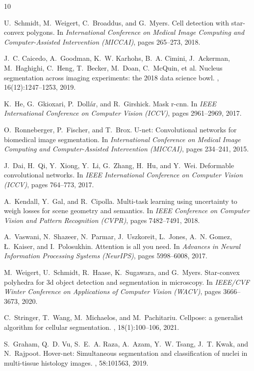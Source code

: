 \documentclass[acmlarge]{acmart}
\begin{document}

\begin{thebibliography}{10}

U.~Schmidt, M.~Weigert, C.~Broaddus, and G.~Myers.
\newblock Cell detection with star-convex polygons.
\newblock In {\em International Conference on Medical Image Computing and Computer-Assisted Intervention (MICCAI)}, pages 265--273, 2018.

J.~C. Caicedo, A.~Goodman, K.~W. Karhohs, B.~A. Cimini, J.~Ackerman, M.~Haghighi, C.~Heng, T.~Becker, M.~Doan, C.~McQuin, et al.
\newblock Nucleus segmentation across imaging experiments: the 2018 data science bowl.
, 16(12):1247--1253, 2019.

K.~He, G.~Gkioxari, P.~Doll{\'a}r, and R.~Girshick.
\newblock Mask r-cnn.
\newblock In {\em IEEE International Conference on Computer Vision (ICCV)}, pages 2961--2969, 2017.

O.~Ronneberger, P.~Fischer, and T.~Brox.
\newblock U-net: Convolutional networks for biomedical image segmentation.
\newblock In {\em International Conference on Medical Image Computing and Computer-Assisted Intervention (MICCAI)}, pages 234--241, 2015.

J.~Dai, H.~Qi, Y.~Xiong, Y.~Li, G.~Zhang, H.~Hu, and Y.~Wei.
\newblock Deformable convolutional networks.
\newblock In {\em IEEE International Conference on Computer Vision (ICCV)}, pages 764--773, 2017.

A.~Kendall, Y.~Gal, and R.~Cipolla.
\newblock Multi-task learning using uncertainty to weigh losses for scene geometry and semantics.
\newblock In {\em IEEE Conference on Computer Vision and Pattern Recognition (CVPR)}, pages 7482--7491, 2018.

A.~Vaswani, N.~Shazeer, N.~Parmar, J.~Uszkoreit, L.~Jones, A.~N. Gomez, {\L}.~Kaiser, and I.~Polosukhin.
\newblock Attention is all you need.
\newblock In {\em Advances in Neural Information Processing Systems (NeurIPS)}, pages 5998--6008, 2017.

M.~Weigert, U.~Schmidt, R.~Haase, K.~Sugawara, and G.~Myers.
\newblock Star-convex polyhedra for 3d object detection and segmentation in microscopy.
\newblock In {\em IEEE/CVF Winter Conference on Applications of Computer Vision (WACV)}, pages 3666--3673, 2020.

C.~Stringer, T.~Wang, M.~Michaelos, and M.~Pachitariu.
\newblock Cellpose: a generalist algorithm for cellular segmentation.
, 18(1):100--106, 2021.

S.~Graham, Q.~D. Vu, S.~E.~A. Raza, A.~Azam, Y.~W. Tsang, J.~T. Kwak, and N.~Rajpoot.
\newblock Hover-net: Simultaneous segmentation and classification of nuclei in multi-tissue histology images.
, 58:101563, 2019.

\end{thebibliography}
\end{document}
